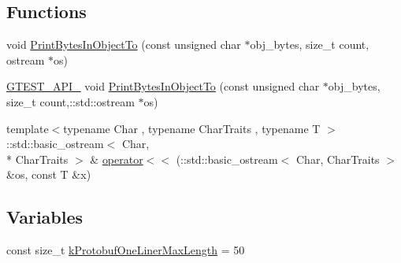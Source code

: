 \subsection*{Functions}
\begin{DoxyCompactItemize}
\item 
void \hyperlink{namespacetesting_1_1internal2_abfb9aa80365f93b952e9a4bea09947a8}{Print\-Bytes\-In\-Object\-To} (const unsigned char $\ast$obj\-\_\-bytes, size\-\_\-t count, ostream $\ast$os)
\item 
\hyperlink{gtest-port_8h_aa73be6f0ba4a7456180a94904ce17790}{G\-T\-E\-S\-T\-\_\-\-A\-P\-I\-\_\-} void \hyperlink{namespacetesting_1_1internal2_a04a384ee5de3a9f4f00a6052ea79b495}{Print\-Bytes\-In\-Object\-To} (const unsigned char $\ast$obj\-\_\-bytes, size\-\_\-t count,\-::std\-::ostream $\ast$os)
\item 
{\footnotesize template$<$typename Char , typename Char\-Traits , typename T $>$ }\\\-::std\-::basic\-\_\-ostream$<$ Char, \\*
Char\-Traits $>$ \& \hyperlink{namespacetesting_1_1internal2_a07dbe129beb8952074f04b599dfce39b}{operator$<$$<$} (\-::std\-::basic\-\_\-ostream$<$ Char, Char\-Traits $>$ \&os, const T \&x)
\end{DoxyCompactItemize}
\subsection*{Variables}
\begin{DoxyCompactItemize}
\item 
const size\-\_\-t \hyperlink{namespacetesting_1_1internal2_a140c8efd51e63a3def98445bff107518}{k\-Protobuf\-One\-Liner\-Max\-Length} = 50
\end{DoxyCompactItemize}



